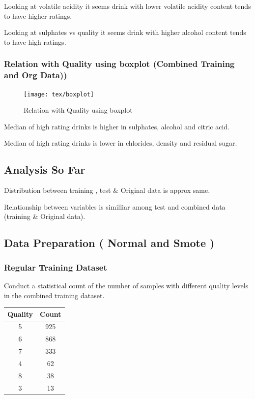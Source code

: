Looking at volatile acidity it seems drink with lower volatile acidity content tends to have higher ratings.

Looking at sulphates vs quality it seems drink with higher alcohol content tends to have high ratings.

\subsubsection{Relation with Quality using boxplot (Combined Training and Org Data))}\phantom{...}

\begin{figure}[H]
	\centering
	\texttt{[image: tex/boxplot]}
	\caption{Relation with Quality using boxplot}
	\label{fig:boxplot}
\end{figure}

Median of high rating drinks is higher in sulphates, alcohol and citric acid.

Median of high rating drinks is lower in chlorides, density and residual sugar.

\subsection{Analysis So Far}\phantom{...}

Distribution between training , test \& Original data is approx same.

Relationship between variables is similliar among test and combined data (training \& Original data).

\subsection{Data Preparation ( Normal and Smote )}\phantom{...}

\subsubsection{Regular Training Dataset}\phantom{...}

Conduct a statistical count of the number of samples with different quality levels in the combined training dataset.

\begin{center}
	\begin{tabular}{|c|c|}
		\hline
		Quality & Count \\
		\hline
		5 & 925 \\
		6 & 868 \\
		7 & 333 \\
		4 & 62 \\
		8 & 38 \\
		3 & 13 \\
		\hline
	\end{tabular}
\end{center}

